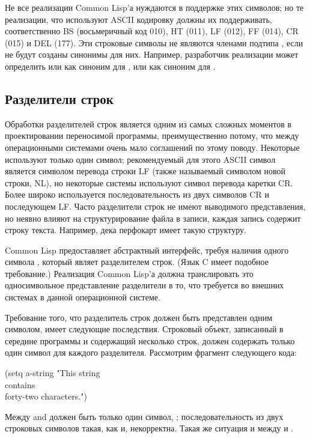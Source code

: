 Не все реализации Common Lisp'а нуждаются в поддержке этих символов; но те
реализации, что используют ASCII кодировку должны их поддерживать,
соответственно BS (восьмеричный код 010), HT (011), LF (012), FF (014), CR
(015) и DEL (177). Эти строковые символы не являются членами подтипа
, если не будут созданы синонимы для них.
Например, разработчик реализации может 
определить  или  как
синоним для ,
или  как синоним для .

\subsection{Разделители строк}

Обработки разделителей строк является одним из самых сложных моментов в
проектировании переносимой программы, преимущественно потому, что между
операционными системами очень мало соглашений по этому поводу. Некоторые
используют только один символ; рекомендуемый для этого ASCII символ является
символом перевода строки LF (также называемый символом новой строки, NL),
но некоторые системы используют символ перевода каретки CR. Более
широко используется последовательность из двух символов CR и последующем
LF. Часто разделители строк не имеют выводимого представления, но неявно влияют
на структурирование файла в записи, каждая запись содержит строку
текста. Например, дека перфокарт имеет такую структуру.

Common Lisp предоставляет абстрактный интерфейс, требуя наличия одного символа
, который являет разделителем строк. (Язык C имеет
подобное требование.)
Реализация Common Lisp'а должна транслировать это односимвольное представление
разделители в то, что требуется во внешних системах в данной операционной системе.

Требование того, что разделитель строк должен быть представлен одним символом,
имеет следующие последствия. Строковый объект, записанный в середине программы и
содержащий несколько строк, должен содержать только один символ для каждого
разделителя. Рассмотрим фрагмент следующего кода:
\begin{lisp}
(setq a-string "This string \\
contains \\
forty-two characters.")
\end{lisp}

Между  and  должен быть только один символ,
; последовательность из двух строковых символов
такая, как  и,
некорректна.
Такая же ситуация и между  и .

